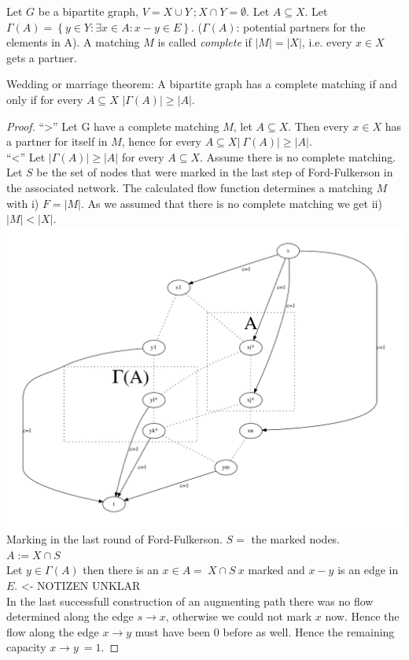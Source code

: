 \begin{definition}
Let $G$ be a bipartite graph, $V = X \cup Y \: ; X \cap Y = \emptyset$. Let $A \subseteq X$. Let $\Gamma(A)=
\left\{y \in Y: \exists x \in A: x - y \in E\right\}$. ($\Gamma(A)$: potential partners for the elements in A).
A matching $M$ is called \emph{complete} if $\lvert M \rvert = \lvert X \rvert$, i.e. every $x \in X$ gets a partner.
\end{definition}
\begin{theorem}
Wedding or marriage theorem: A bipartite graph has a complete matching if and only if for every $A \subseteq X$
$\lvert \Gamma(A) \rvert \ge \lvert A \rvert$.
\end{theorem}
\begin{proof}
``>'' Let G have a complete matching $M$, let $A \subseteq X$. Then every $x \in X$ has a partner for itself in $M$,
hence for every $A \subseteq X \lvert \: \Gamma(A) \rvert\ge \lvert A \rvert$. \\
``<'' Let $\lvert \Gamma (A) \rvert \ge \lvert A \rvert$ for every $A \subseteq X$. Assume there is no complete
matching. Let $S$ be the set of nodes that were marked in the last step of Ford-Fulkerson in the associated 
network. The calculated flow function determines a matching $M$ with i) $F=\lvert M \rvert$. As we assumed that there
is no complete matching we get ii) $\lvert M \rvert < \lvert X \rvert$.\\
\includegraphics[scale=0.45]{diagrams/Chapter4_Example5.pdf}\\
Marking in the last round of Ford-Fulkerson. $S=$ the marked nodes.\\
$A:=X \cap S$\\
Let $y \in \Gamma (A)$ then there is an $x \in A = \: X \cap S \: x$ marked and $x-y$ is an edge in $E$. <- NOTIZEN UNKLAR \\
In the last successfull construction of an augmenting path there was no flow determined along the edge $s \rightarrow x$,
otherwise we could not mark $x$ now. Hence the flow along the edge $x \rightarrow y$ must have been $0$ before 
as well. Hence the remaining capacity $x \rightarrow y \: = 1$.

\end{proof}
